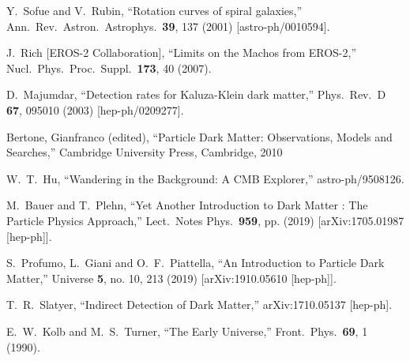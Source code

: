\documentclass[12pt]{report}
\begin{document}
\begin{thebibliography}{}
 Y.~Sofue and V.~Rubin,
  ``Rotation curves of spiral galaxies,''
  Ann.\ Rev.\ Astron.\ Astrophys.\  {\bf 39}, 137 (2001)
  [astro-ph/0010594].

J.~Rich [EROS-2 Collaboration],
  ``Limits on the Machos from EROS-2,''
  Nucl.\ Phys.\ Proc.\ Suppl.\  {\bf 173}, 40 (2007).


D.~Majumdar,
  ``Detection rates for Kaluza-Klein dark matter,''
  Phys.\ Rev.\ D {\bf 67}, 095010 (2003)
  [hep-ph/0209277].

Bertone, Gianfranco (edited),
``Particle Dark Matter: Observations, Models and                     Searches,''
Cambridge University Press, Cambridge, 2010

 W.~T.~Hu,
  ``Wandering in the Background: A CMB Explorer,''
  astro-ph/9508126.

M.~Bauer and T.~Plehn,
  ``Yet Another Introduction to Dark Matter : The Particle Physics Approach,''
  Lect.\ Notes Phys.\  {\bf 959}, pp. (2019)
  [arXiv:1705.01987 [hep-ph]].

  S.~Profumo, L.~Giani and O.~F.~Piattella,
  ``An Introduction to Particle Dark Matter,''
  Universe {\bf 5}, no. 10, 213 (2019)
  [arXiv:1910.05610 [hep-ph]].
  
  T.~R.~Slatyer,
  ``Indirect Detection of Dark Matter,''
  arXiv:1710.05137 [hep-ph].
  
  E.~W.~Kolb and M.~S.~Turner,
  ``The Early Universe,''
  Front.\ Phys.\  {\bf 69}, 1 (1990).


\end{thebibliography}
\end{document}
